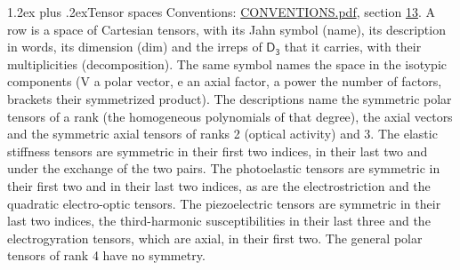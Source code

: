 \documentclass[10pt,a4paper]{article}
\makeatletter
\renewcommand\section{\@startsection{section}{1}{\z@}{-3ex plus -1ex minus -.2ex}%
  {1.2ex plus .2ex}{\normalfont\large\sffamily\bfseries\color{parttitle}}}
\numberwithin{equation}{section}
\newcommand{\grp}[1]{\mathsf{#1}}
\makeatother
\begin{document}
\section{Tensor spaces}\label{s:tensor_spaces}
Conventions: \href{../../CONVENTIONS.pdf}{CONVENTIONS.pdf}, section \href{../../CONVENTIONS.pdf\#conv.13}{13}.
\leavevmode\label{n:head.name}\label{n:head.description}\label{n:head.dim}\label{n:head.decomposition}A row is a space of Cartesian tensors, with its Jahn symbol (name), its description in words, its dimension (dim) and the irreps of $\grp{D_{3}}$ that it carries, with their multiplicities (decomposition). \label{n:label.jahn}The same symbol names the space in the isotypic components (V a polar vector, e an axial factor, a power the number of factors, brackets their symmetrized product). The descriptions name the symmetric polar tensors of a rank (the homogeneous polynomials of that degree), the axial vectors and the symmetric axial tensors of ranks 2 (optical activity) and 3. The elastic stiffness tensors are symmetric in their first two indices, in their last two and under the exchange of the two pairs. The photoelastic tensors are symmetric in their first two and in their last two indices, as are the electrostriction and the quadratic electro-optic tensors. The piezoelectric tensors are symmetric in their last two indices, the third-harmonic susceptibilities in their last three and the electrogyration tensors, which are axial, in their first two. The general polar tensors of rank 4 have no symmetry.
\end{document}
